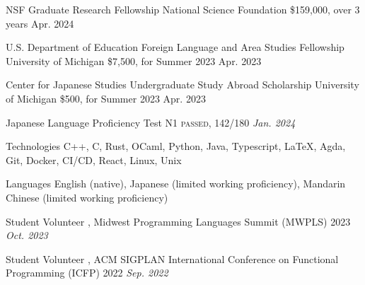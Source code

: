 \documentclass[letterpaper,11pt]{article}
\begin{document}
  \begin{rsectionlist}
    \rsectionitem
      {NSF Graduate Research Fellowship}
      {National Science Foundation}
      {\$159,000, over 3 years}
      {Apr. 2024}


    \rsectionitem
      {U.S. Department of Education Foreign Language and Area Studies Fellowship}
      {University of Michigan}
      {\$7,500, for Summer 2023}
      {Apr. 2023}


    \rsectionitem
      {Center for Japanese Studies Undergraduate Study Abroad Scholarship}
      {University of Michigan}
      {\$500, for Summer 2023}
      {Apr. 2023}

  \end{rsectionlist}

  \begin{rsectionlist}
    \rsectionitemthin
      {Japanese Language Proficiency Test N1}
      { \textsc{passed, 142/180}}
      {\textit{\small Jan. 2024}}
  \end{rsectionlist}

  \begin{rlinelist}
    \rline
      {Technologies}
      {C++, C, Rust, OCaml, Python, Java, Typescript, \LaTeX, Agda,
        Git, Docker, CI/CD, React, Linux, Unix}
      
    \rline
      {Languages}
      {English (native),
        Japanese (limited working proficiency),
        Mandarin Chinese (limited working proficiency)}
  \end{rlinelist}

  \begin{rsectionlist}
    \rsectionitemthin
      {Student Volunteer}
      {, Midwest Programming Languages Summit (MWPLS) 2023}
      {\textit{\small Oct. 2023}}

    \vspace*{-1em}
    \rsectionitemthin
      {Student Volunteer}
      {, ACM SIGPLAN International Conference on Functional Programming (ICFP) 2022}
      {\textit{\small Sep. 2022}}
  \end{rsectionlist}
\end{document}
